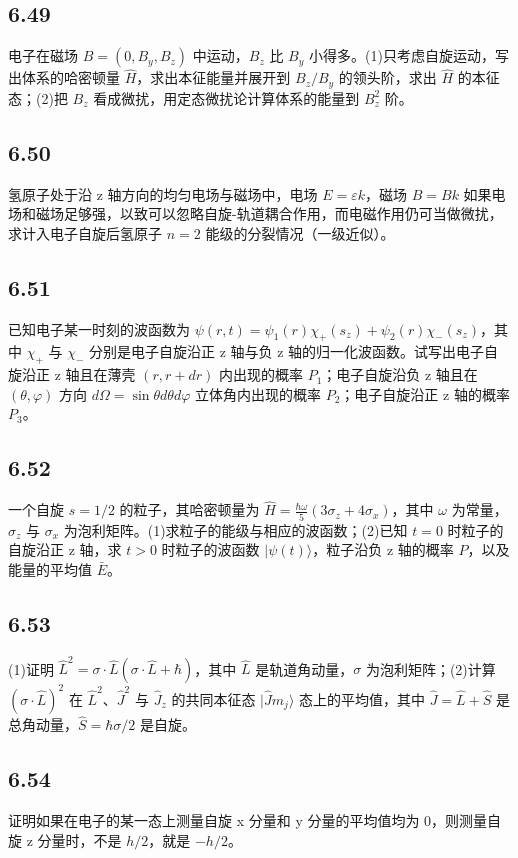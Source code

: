 \subsection{6.49}
电子在磁场 $B = (0, B_y, B_z)$ 中运动，$B_z$ 比 $B_y$ 小得多。(1)只考虑自旋运动，写出体系的哈密顿量 $\hat{H}$，求出本征能量并展开到 $B_z / B_y$ 的领头阶，求出 $\hat{H}$ 的本征态；(2)把 $B_z$ 看成微扰，用定态微扰论计算体系的能量到 $B_z^2$ 阶。

\subsection{6.50}
氢原子处于沿 z 轴方向的均匀电场与磁场中，电场 $E = \varepsilon k$，磁场 $B = Bk$ 如果电场和磁场足够强，以致可以忽略自旋-轨道耦合作用，而电磁作用仍可当做微扰，求计入电子自旋后氢原子 $n = 2$ 能级的分裂情况（一级近似）。

\subsection{6.51}
已知电子某一时刻的波函数为 $\psi(r,t) = \psi_1(r) \chi_+(s_z) + \psi_2(r) \chi_-(s_z)$，其中 $\chi_+$ 与 $\chi_-$ 分别是电子自旋沿正 z 轴与负 z 轴的归一化波函数。试写出电子自旋沿正 z 轴且在薄壳 $(r,r+dr)$ 内出现的概率 $P_1$；电子自旋沿负 z 轴且在 $(\theta,\varphi)$ 方向 $d\Omega = \sin\theta d\theta d\varphi$ 立体角内出现的概率 $P_2$；电子自旋沿正 z 轴的概率 $P_3$。

\subsection{6.52}
一个自旋 $s = 1/2$ 的粒子，其哈密顿量为 $\hat{H} = \frac{\hbar \omega}{5}(3\sigma_z + 4\sigma_x)$，其中 $\omega$ 为常量，$\sigma_z$ 与 $\sigma_x$ 为泡利矩阵。(1)求粒子的能级与相应的波函数；(2)已知 $t = 0$ 时粒子的自旋沿正 z 轴，求 $t > 0$ 时粒子的波函数 $|\psi(t)\rangle$，粒子沿负 z 轴的概率 $P$，以及能量的平均值 $\bar{E}$。

\subsection{6.53}
(1)证明 $\hat{L}^2 = \sigma \cdot \hat{L}(\sigma \cdot \hat{L} + \hbar)$，其中 $\hat{L}$ 是轨道角动量，$\sigma$ 为泡利矩阵；(2)计算 $(\sigma \cdot \hat{L})^2$ 在 $\hat{L}^2$、$\hat{J}^2$ 与 $\hat{J}_z$ 的共同本征态 $|\hat{J}m_j\rangle$ 态上的平均值，其中 $\hat{J} = \hat{L} + \hat{S}$ 是总角动量，$\hat{S} = \hbar \sigma / 2$ 是自旋。

\subsection{6.54}
证明如果在电子的某一态上测量自旋 x 分量和 y 分量的平均值均为 0，则测量自旋 z 分量时，不是 $h/2$，就是 $-h/2$。

